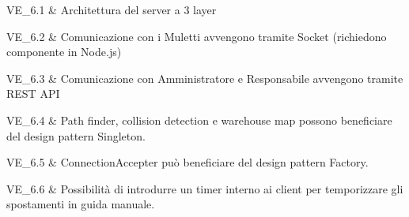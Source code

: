 VE\_6.1 & Architettura del server a 3 layer

\tabularnewline
VE\_6.2 & Comunicazione con i Muletti avvengono tramite Socket (richiedono componente in Node.js)

\tabularnewline
VE\_6.3 & Comunicazione con Amministratore e Responsabile avvengono tramite REST API

\tabularnewline
VE\_6.4 & Path finder, collision detection e warehouse map possono beneficiare del design pattern Singleton.

\tabularnewline
VE\_6.5 & ConnectionAccepter può beneficiare del design pattern Factory.

\tabularnewline
VE\_6.6 & Possibilità di introdurre un timer interno ai client per temporizzare gli spostamenti in guida manuale.
